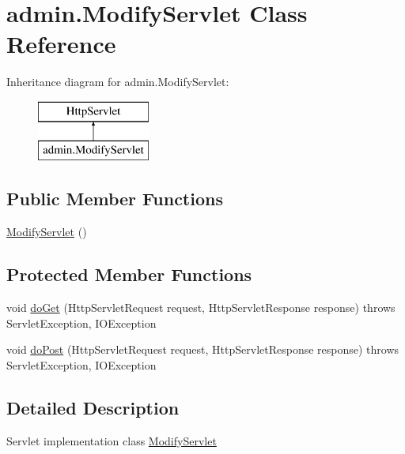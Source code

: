 \hypertarget{classadmin_1_1_modify_servlet}{}\section{admin.\+Modify\+Servlet Class Reference}
\label{classadmin_1_1_modify_servlet}
Inheritance diagram for admin.\+Modify\+Servlet\+:\begin{figure}[H]
\begin{center}
\leavevmode
\includegraphics[height=2.000000cm]{classadmin_1_1_modify_servlet}
\end{center}
\end{figure}
\subsection*{Public Member Functions}
\begin{DoxyCompactItemize}
\item 
\hyperlink{classadmin_1_1_modify_servlet_a8afe56ea4faeb9511cdf1ad20497e3bc}{Modify\+Servlet} ()
\end{DoxyCompactItemize}
\subsection*{Protected Member Functions}
\begin{DoxyCompactItemize}
\item 
void \hyperlink{classadmin_1_1_modify_servlet_a58774982d5e6398cb6d3016f1b652c22}{do\+Get} (Http\+Servlet\+Request request, Http\+Servlet\+Response response)  throws Servlet\+Exception, I\+O\+Exception 
\item 
void \hyperlink{classadmin_1_1_modify_servlet_a84c3c7bb3f9338a98c39c19557847422}{do\+Post} (Http\+Servlet\+Request request, Http\+Servlet\+Response response)  throws Servlet\+Exception, I\+O\+Exception 
\end{DoxyCompactItemize}


\subsection{Detailed Description}
Servlet implementation class \hyperlink{classadmin_1_1_modify_servlet}{Modify\+Servlet} 

